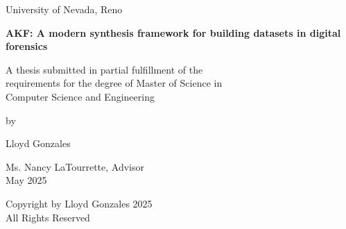 \documentclass[letterpaper,12pt]{report}
\begin{document}

\newpage
\thispagestyle{empty}
\singlespacing

\begin{center}

\null

\vspace{1.5in}

University of Nevada, Reno \\

\vspace{1.5in}

\textbf{AKF: A modern synthesis framework for building datasets in digital forensics}

\vspace{1.5in}

A thesis submitted in partial fulfillment of the\\
requirements for the degree of Master of Science in\\
Computer Science and Engineering\\

\vspace{1in}

by

\vspace{0.25in}
Lloyd Gonzales
\vspace{0.5in}

Ms. Nancy LaTourrette, Advisor \\
May 2025\\

\end{center}


\newpage
\thispagestyle{empty}
\doublespacing

\begin{center}

\null

\vspace{4in}

Copyright by Lloyd Gonzales 2025\\
All Rights Reserved\\

\end{center}

\end{document}
